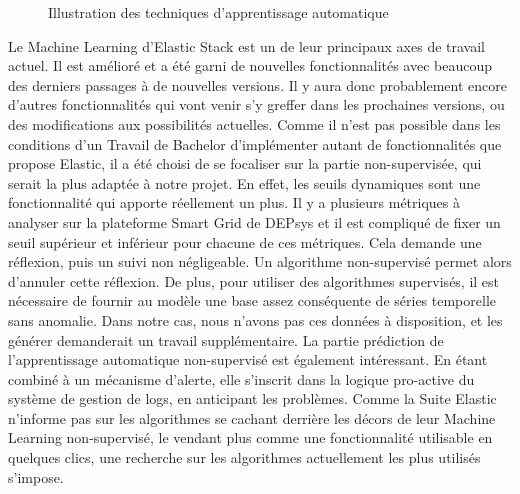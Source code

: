 \documentclass[paper=a4, fontsize=11pt]{scrartcl}
\begin{document}
\begin{figure}[H]
  \centering
  \hfill
  \caption{Illustration des techniques d'apprentissage automatique}
  \label{f-illustrationsML}
\end{figure}

Le Machine Learning d'Elastic Stack est un de leur principaux axes de travail actuel. Il est amélioré et a été garni de nouvelles fonctionnalités avec beaucoup des derniers passages à de nouvelles versions. Il y aura donc probablement encore d'autres fonctionnalités qui vont venir s'y greffer dans les prochaines versions, ou des modifications aux possibilités actuelles.\newline
Comme il n'est pas possible dans les conditions d'un Travail de Bachelor d'implémenter autant de fonctionnalités que propose Elastic, il a été choisi de se focaliser sur la partie non-supervisée, qui serait la plus adaptée à notre projet. En effet, les seuils dynamiques sont une fonctionnalité qui apporte réellement un plus. Il y a plusieurs métriques à analyser sur la plateforme Smart Grid de DEPsys et il est compliqué de fixer un seuil supérieur et inférieur pour chacune de ces métriques. Cela demande une réflexion, puis un suivi non négligeable. Un algorithme non-supervisé permet alors d'annuler cette réflexion. De plus, pour utiliser des algorithmes supervisés, il est nécessaire de fournir au modèle une base assez conséquente de séries temporelle sans anomalie. Dans notre cas, nous n'avons pas ces données à disposition, et les générer demanderait un travail supplémentaire. \newline
La partie prédiction de l'apprentissage automatique non-supervisé est également intéressant. En étant combiné à un mécanisme d'alerte, elle s'inscrit dans la logique pro-active du système de gestion de logs, en anticipant les problèmes.\newline
Comme la Suite Elastic n'informe pas sur les algorithmes se cachant derrière les décors de leur Machine Learning non-supervisé, le vendant plus comme une fonctionnalité utilisable en quelques clics, une recherche sur les algorithmes actuellement les plus utilisés s'impose.
\end{document}
